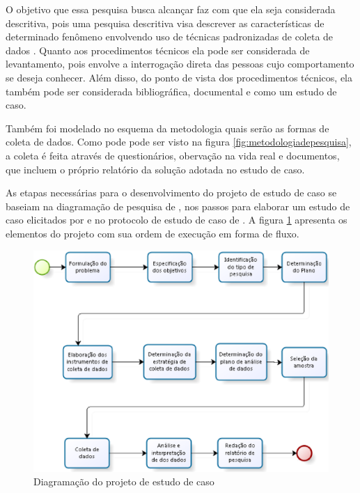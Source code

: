 O objetivo que essa pesquisa busca alcançar faz com que ela seja considerada descritiva, pois uma pesquisa descritiva visa descrever as características de determinado fenômeno envolvendo uso de técnicas padronizadas de coleta de dados \cite{metodologia_edna}. Quanto aos procedimentos técnicos ela pode ser considerada de levantamento, pois envolve a interrogação direta das pessoas cujo comportamento se deseja conhecer. Além disso, do ponto de vista dos procedimentos técnicos, ela também pode ser considerada bibliográfica, documental e como um estudo de caso.

Também foi modelado no esquema da metodologia quais serão as formas de coleta de dados. Como pode pode ser visto na figura \ref{fig:metodologiadepesquisa}, a coleta é feita através de questionários, obervação na vida real e documentos, que incluem o próprio relatório da solução adotada no estudo de caso.

As etapas necessárias para o desenvolvimento do projeto de estudo de caso se baseiam na diagramação de pesquisa de , nos passos para elaborar um estudo de caso elicitados por  e no protocolo de estudo de caso de . A figura \ref{fig:projeto-pesq} apresenta os elementos do projeto com sua ordem de execução em forma de fluxo.


\begin{figure}[h!]
\centering
\includegraphics[keepaspectratio=false,scale=0.65]{figuras/figuras_pedro/projeto-pesq.eps}
\caption{Diagramação do projeto de estudo de caso}
\label{fig:projeto-pesq}
\end{figure}
\FloatBarrier


